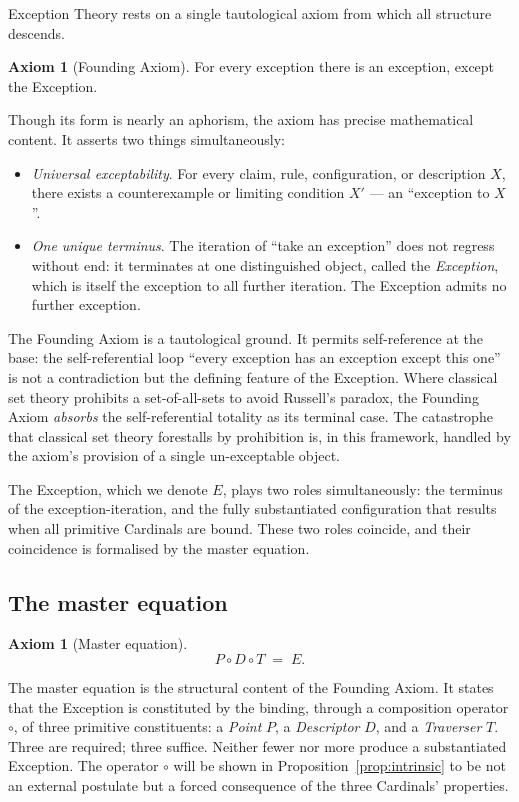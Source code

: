 \documentclass[11pt,a4paper]{article}
\theoremstyle{definition}
\newtheorem{axiom}[theorem]{Axiom}
\theoremstyle{remark}
\begin{document}
Exception Theory rests on a single tautological axiom from which all structure descends.

\begin{axiom}[Founding Axiom]\label{ax:founding}
For every exception there is an exception, except the Exception.
\end{axiom}

Though its form is nearly an aphorism, the axiom has precise mathematical content. It asserts two things simultaneously:
\begin{itemize}[leftmargin=*]
\item \emph{Universal exceptability}. For every claim, rule, configuration, or description $X$, there exists a counterexample or limiting condition $X'$ --- an ``exception to $X$''.
\item \emph{One unique terminus}. The iteration of ``take an exception'' does not regress without end: it terminates at one distinguished object, called the \emph{Exception}, which is itself the exception to all further iteration. The Exception admits no further exception.
\end{itemize}

The Founding Axiom is a tautological ground. It permits self-reference at the base: the self-referential loop ``every exception has an exception except this one'' is not a contradiction but the defining feature of the Exception. Where classical set theory prohibits a set-of-all-sets to avoid Russell's paradox, the Founding Axiom \emph{absorbs} the self-referential totality as its terminal case. The catastrophe that classical set theory forestalls by prohibition is, in this framework, handled by the axiom's provision of a single un-exceptable object.

The Exception, which we denote $E$, plays two roles simultaneously: the terminus of the exception-iteration, and the fully substantiated configuration that results when all primitive Cardinals are bound. These two roles coincide, and their coincidence is formalised by the master equation.

\subsection{The master equation}

\begin{axiom}[Master equation]\label{ax:master}
\[
\boxed{\;P \circ D \circ T \;=\; E.\;}
\]
\end{axiom}

The master equation is the structural content of the Founding Axiom. It states that the Exception is constituted by the binding, through a composition operator $\circ$, of three primitive constituents: a \emph{Point} $P$, a \emph{Descriptor} $D$, and a \emph{Traverser} $T$. Three are required; three suffice. Neither fewer nor more produce a substantiated Exception. The operator $\circ$ will be shown in Proposition~\ref{prop:intrinsic} to be not an external postulate but a forced consequence of the three Cardinals' properties.
\end{document}
